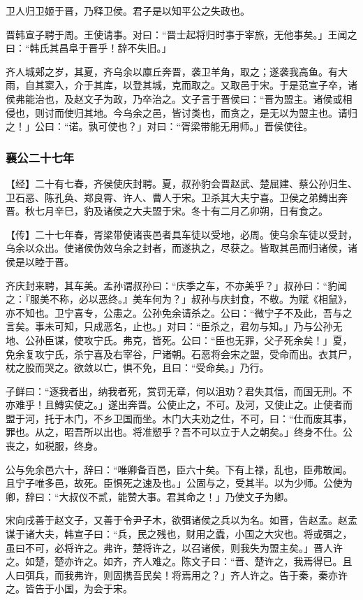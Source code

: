 \documentclass[]{article}
\begin{document}
卫人归卫姬于晋，乃释卫侯。君子是以知平公之失政也。

晋韩宣子聘于周。王使请事。对曰：``晋士起将归时事于宰旅，无他事矣。」王闻之曰：``韩氏其昌阜于晋乎！辞不失旧。」

齐人城郏之岁，其夏，齐乌余以廪丘奔晋，袭卫羊角，取之；遂袭我高鱼。有大雨，自其窦入，介于其库，以登其城，克而取之。又取邑于宋。于是范宣子卒，诸侯弗能治也，及赵文子为政，乃卒治之。文子言于晋侯曰：``晋为盟主。诸侯或相侵也，则讨而使归其地。今乌余之邑，皆讨类也，而贪之，是无以为盟主也。请归之！」公曰：``诺。孰可使也？」对曰：``胥梁带能无用师。」晋侯使往。

\hypertarget{header-n2228}{%
\subsubsection{襄公二十七年}\label{header-n2228}}

【经】二十有七春，齐侯使庆封聘。夏，叔孙豹会晋赵武、楚屈建、蔡公孙归生、卫石恶、陈孔奂、郑良霄、许人、曹人于宋。卫杀其大夫宁喜。卫侯之弟鱄出奔晋。秋七月辛巳，豹及诸侯之大夫盟于宋。冬十有二月乙卯朔，日有食之。

【传】二十七年春，胥梁带使诸丧邑者具车徒以受地，必周。使乌余车徒以受封，乌余以众出。使诸侯伪效乌余之封者，而遂执之，尽获之。皆取其邑而归诸侯，诸侯是以睦于晋。

齐庆封来聘，其车美。孟孙谓叔孙曰：``庆季之车，不亦美乎？」叔孙曰：``豹闻之：『服美不称，必以恶终。』美车何为？」叔孙与庆封食，不敬。为赋《相鼠》，亦不知也。卫宁喜专，公患之。公孙免余请杀之。公曰：``微宁子不及此，吾与之言矣。事未可知，只成恶名，止也。」对曰：``臣杀之，君勿与知。」乃与公孙无地、公孙臣谋，使攻宁氏。弗克，皆死。公曰：``臣也无罪，父子死余矣！」夏，免余复攻宁氏，杀宁喜及右宰谷，尸诸朝。石恶将会宋之盟，受命而出。衣其尸，枕之股而哭之。欲敛以亡，惧不免，且曰：``受命矣。」乃行。

子鲜曰：``逐我者出，纳我者死，赏罚无章，何以沮劝？君失其信，而国无刑。不亦难乎！且鱄实使之。」遂出奔晋。公使止之，不可。及河，又使止之。止使者而盟于河，托于木门，不乡卫国而坐。木门大夫劝之仕，不可，曰：``仕而废其事，罪也。从之，昭吾所以出也。将准愬乎？吾不可以立于人之朝矣。」终身不仕。公丧之，如税服，终身。

公与免余邑六十，辞曰：``唯卿备百邑，臣六十矣。下有上禄，乱也，臣弗敢闻。且宁子唯多邑，故死。臣惧死之速及也。」公固与之，受其半。以为少师。公使为卿，辞曰：``大叔仪不贰，能赞大事。君其命之！」乃使文子为卿。

宋向戌善于赵文子，又善于令尹子木，欲弭诸侯之兵以为名。如晋，告赵孟。赵孟谋于诸大夫，韩宣子曰：``兵，民之残也，财用之蠹，小国之大灾也。将或弭之，虽曰不可，必将许之。弗许，楚将许之，以召诸侯，则我失为盟主矣。」晋人许之。如楚，楚亦许之。如齐，齐人难之。陈文子曰：``晋、楚许之，我焉得已。且人曰弭兵，而我弗许，则固携吾民矣！将焉用之？」齐人许之。告于秦，秦亦许之。皆告于小国，为会于宋。
\end{document}
